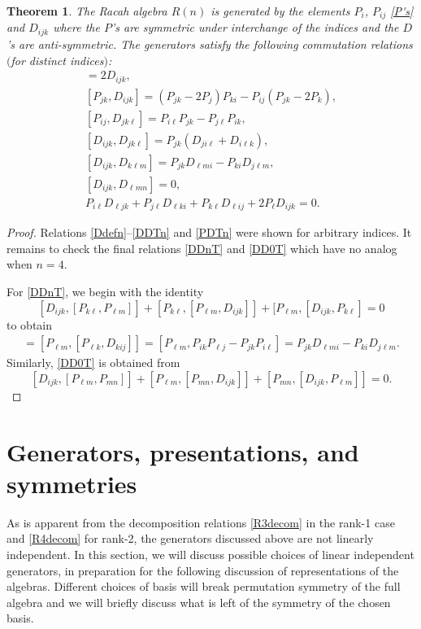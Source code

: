 \documentclass[pdftex]{sigma}
\numberwithin{equation}{section}
\newtheorem{Theorem}{Theorem}[section]
\begin{document}
\begin{Theorem}
\label{bigthmn2} The Racah algebra $R(n)$ is generated by the elements $P_i$, $P_{ij}$ \eqref{P's} and $D_{ijk}$ where the $P$'s are symmetric under interchange of the indices and the $D$'s are anti-symmetric. The generators satisfy the following commutation relations $($for distinct indices$)$:
\begin{gather}%
[P_{ij}, P_{jk}]=2 D_{ijk}, \label{Ddefn}\\
[P_{jk},D_{ijk}]=  (P_{jk}-2P_j )P_{ki}-P_{ij} (P_{jk}-2P_{k} ),\\
[P_{ij}, D_{jk\ell}] =P_{i\ell}P_{jk}-P_{j\ell}P_{ik},\\
[D_{ijk}, D_{jk\ell}] = P_{jk} (D_{ji\ell} +D_{i\ell k} ),\label{DDTn}\\
[D_{ijk}, D_{k\ell m }] = P_{jk}D_{\ell mi} - P_{ki}D_{j \ell m},\label{DDnT}\\
[D_{ijk}, D_{\ell m n}] = 0,\label{DD0T}\\
P_{i\ell}D_{\ell jk}+ P_{j\ell} D_{\ell ki}+P_{k\ell}D_{\ell ij}+2P_{\ell}D_{ijk}=0.\label{PDTn}
\end{gather}
\end{Theorem}
\begin{proof}
Relations \eqref{Ddefn}--\eqref{DDTn} and \eqref{PDTn} were shown for arbitrary indices. It remains to check the final relations \eqref{DDnT} and \eqref{DD0T} which have no analog when $n=4$.

For \eqref{DDnT}, we begin with the identity
\[ [D_{ijk}, [P_{k\ell}, P_{\ell m} ]] + [P_{k\ell}, [ P_{\ell m}, D_{ijk}]] + [P_{\ell m},[D_{ijk}, P_{k\ell}]=0\]
to obtain
\begin{align*}
  [D_{ijk}, D_{k\ell m}]= [P_{\ell m}, [P_{\ell k}, D_{kij}]]
  =[ P_{\ell m}, P_{ik} P_{\ell j} - P_{jk}P_{i\ell}]
  = P_{jk}D_{\ell mi} - P_{ki}D_{j \ell m}.
\end{align*}
Similarly, \eqref{DD0T} is obtained from
\[ [D_{ijk}, [P_{\ell m }, P_{ mn} ]] + [P_{\ell m}, [ P_{ m n}, D_{ijk}]] + [P_{m n},[D_{ijk}, P_{\ell m}]]=0.\tag*{\qed}
\]\renewcommand{\qed}{}
\end{proof}


\section{Generators, presentations, and symmetries}
\label{gen}
As is apparent from the decomposition relations \eqref{R3decom} in the rank-1 case and \eqref{R4decom} for rank-2, the generators discussed above are not linearly independent. In this section, we will discuss possible choices of linear independent generators, in preparation for the following discussion of representations of the algebras. Different choices of basis will break permutation symmetry of the full algebra and we will briefly discuss what is left of the symmetry of the chosen basis.
\end{document}
